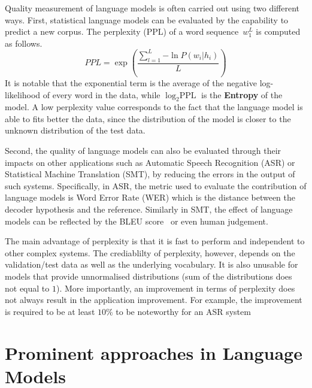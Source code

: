 Quality measurement of language models is often carried out using two different ways. First, statistical language models can be evaluated by the capability to predict a new corpus. The perplexity (PPL) of a word sequence~\textbf{$w_1^L$} is computed as follows.
\begin{equation}
\label{eq:ppl}
PPL = \exp(\frac{\sum_{l=1}^L{-\ln P(w_i|h_i)}}{L}  )
\end{equation}
It is notable that the exponential term is the average of the negative log-likelihood of every word in the data, while $\log_2 \text{PPL}$ is the \textbf{Entropy} of the model. A low perplexity value corresponds to the fact that the language model is able to fits better the data, since the distribution of the model is closer to the unknown distribution of the test data. 

Second, the quality of language models can also be evaluated through their impacts on other applications such as Automatic Speech Recognition (ASR) or Statistical Machine Translation (SMT), by reducing the errors in the output of such systems. Specifically, in ASR, the metric used to evaluate the contribution of language models is Word Error Rate (WER) which is the distance between the decoder hypothesis and the reference. Similarly in SMT, the effect of language models can be reflected by the BLEU score~\cite{papineni2002bleu} or even human judgement. 

The main advantage of perplexity is that it is fast to perform and independent to other complex systems. The crediablilty of perplexity, however, depends on the validation/test data as well as the underlying vocabulary. It is also unusable for models that provide unnormalised distributions (sum of the distributions does not equal to $1$). More importantly, an improvement in terms of perplexity does not always result in the application improvement. For example, the improvement is required to be at least $10\%$ to be noteworthy for an ASR system~\cite{Rosenfeld:2000}



\section{Prominent approaches in Language Models}

